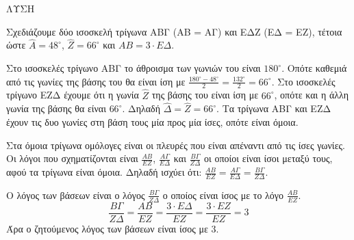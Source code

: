 ΛΥΣΗ

Σχεδιάζουμε δύο ισοσκελή τρίγωνα ΑΒΓ (ΑΒ = ΑΓ) και ΕΔΖ (ΕΔ = ΕΖ), τέτοια ώστε $\hat{A} = 48^\circ$, $\hat{Z} = 66^\circ$ και $AB = 3 \cdot E\Delta$.

Στο ισοσκελές τρίγωνο ΑΒΓ το άθροισμα των γωνιών του είναι $180^\circ$. Οπότε καθεμιά από τις γωνίες της βάσης του θα είναι ίση με $\frac{180^\circ - 48^\circ}{2} = \frac{132^\circ}{2} = 66^\circ$. Στο ισοσκελές τρίγωνο ΕΖΔ έχουμε ότι η γωνία $\hat{Z}$ της βάσης του είναι ίση με $66^\circ$, οπότε και η άλλη γωνία της βάσης θα είναι $66^\circ$. Δηλαδή $\hat{\Delta} = \hat{Z} = 66^\circ$. Τα τρίγωνα ΑΒΓ και ΕΖΔ έχουν τις δυο γωνίες στη βάση τους μία προς μία ίσες, οπότε είναι όμοια.

\begin{alist}
\item [\textbeta)]
\begin{rlist}
\item Στα όμοια τρίγωνα ομόλογες είναι οι πλευρές που είναι απέναντι από τις ίσες γωνίες. Οι λόγοι που σχηματίζονται είναι $\frac{AB}{EZ}$, $\frac{A\Gamma}{E\Delta}$ και $\frac{B\Gamma}{Z\Delta}$ οι οποίοι είναι ίσοι μεταξύ τους, αφού τα τρίγωνα είναι όμοια. Δηλαδή ισχύει ότι: $\frac{AB}{EZ} = \frac{A\Gamma}{E\Delta} = \frac{B\Gamma}{Z\Delta}$.
\item Ο λόγος των βάσεων είναι ο λόγος $\frac{B\Gamma}{Z\Delta}$ ο οποίος είναι ίσος με το λόγο $\frac{AB}{EZ}$.
\[ \frac{B\Gamma}{Z\Delta} = \frac{AB}{EZ} = \frac{3 \cdot E\Delta}{EZ} = \frac{3 \cdot EZ}{EZ} = 3 \]
Άρα ο ζητούμενος λόγος των βάσεων είναι ίσος με $3$.
\end{rlist}
\end{alist}